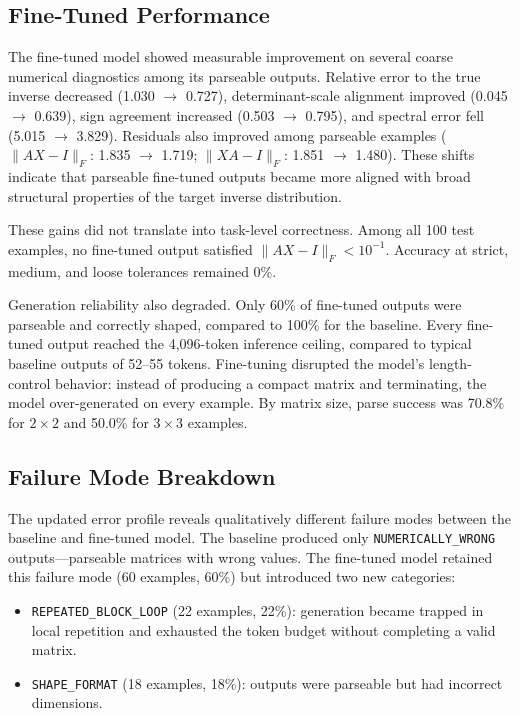 \subsection{Fine-Tuned Performance}

The fine-tuned model showed measurable improvement on several coarse numerical diagnostics among its parseable outputs. Relative error to the true inverse decreased (1.030 $\to$ 0.727), determinant-scale alignment improved (0.045 $\to$ 0.639), sign agreement increased (0.503 $\to$ 0.795), and spectral error fell (5.015 $\to$ 3.829). Residuals also improved among parseable examples ($\|AX - I\|_F$: 1.835 $\to$ 1.719; $\|XA - I\|_F$: 1.851 $\to$ 1.480). These shifts indicate that parseable fine-tuned outputs became more aligned with broad structural properties of the target inverse distribution.

These gains did not translate into task-level correctness. Among all 100 test examples, no fine-tuned output satisfied $\|AX - I\|_F < 10^{-1}$. Accuracy at strict, medium, and loose tolerances remained 0\%.

Generation reliability also degraded. Only 60\% of fine-tuned outputs were parseable and correctly shaped, compared to 100\% for the baseline. Every fine-tuned output reached the 4{,}096-token inference ceiling, compared to typical baseline outputs of 52--55 tokens. Fine-tuning disrupted the model's length-control behavior: instead of producing a compact matrix and terminating, the model over-generated on every example. By matrix size, parse success was 70.8\% for $2 \times 2$ and 50.0\% for $3 \times 3$ examples.

\subsection{Failure Mode Breakdown}

The updated error profile reveals qualitatively different failure modes between the baseline and fine-tuned model. The baseline produced only \texttt{NUMERICALLY\_WRONG} outputs---parseable matrices with wrong values. The fine-tuned model retained this failure mode (60 examples, 60\%) but introduced two new categories:

\begin{itemize}
    \item \texttt{REPEATED\_BLOCK\_LOOP} (22 examples, 22\%): generation became trapped in local repetition and exhausted the token budget without completing a valid matrix.
    \item \texttt{SHAPE\_FORMAT} (18 examples, 18\%): outputs were parseable but had incorrect dimensions.
\end{itemize}

